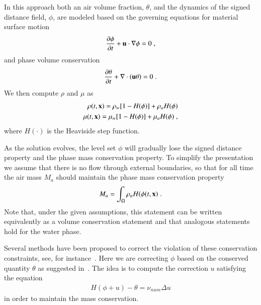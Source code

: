 \documentclass[final,3p,times]{elsarticle}
\begin{document}
In this approach both an air volume fraction, $\theta$, and the dynamics of the signed distance field, $\phi$, are modeled based on the governing equations for material surface motion
\begin{align}
\label{eq:ls_transport_1}
   \frac{\partial \phi}{\partial t} + \mathbf{u}\cdot\nabla\phi = 0 \; ,
\end{align}
and phase volume conservation
\begin{align}
\label{eq:ls_transport_2}
   \frac{\partial \theta}{\partial t} + \nabla\cdot(\mathbf{u}\theta) = 0 \; .
\end{align}
We then compute $\rho$ and $\mu$ as 
\begin{align}
\label{eq:two_phase_rho}
   \rho(t,\mathbf{x}) = \rho_w [1-H(\phi)] + \rho_a H(\phi)\\
\label{eq:two_phase_nu}
   \mu(t,\mathbf{x}) = \mu_w [1-H(\phi)] + \mu_a H(\phi) \; ,
\end{align}
where $H(\cdot)$ is the Heaviside step function. 

As the solution evolves, the level set $\phi$ will gradually lose the signed distance property and the phase mass conservation property. To simplify the presentation we assume that there is no flow through external boundaries, so that for all time the air mass $M_a$ should maintain the phase mass conservation property
\begin{equation}
M_a = \int_{\Omega} \rho_a H(\phi(t,\mathbf{x}) \; .
\end{equation}
Note that, under the given assumptions, this statement can be written equivalently as a volume conservation statement and that analogous statements hold for the water phase.

Several methods have been proposed to correct the violation of these conservation constraints, see, for instance~\cite{Sussman2000,PSVW2004}. 
Here we are correcting $\phi$ based on the conserved quantity $\theta$ as suggested in~\cite{KAFB11}. The idea is to compute the correction $u$ satisfying the equation
\begin{align}
\label{eq:mass_correction}
   H(\phi+u) - \theta = \nu_{num} \Delta u 
\end{align}
in order to maintain the mass conservation. %
\end{document}
